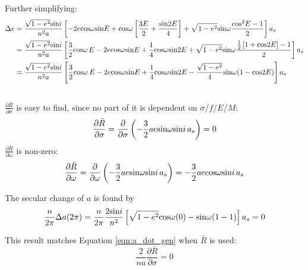 \documentclass[]{aiaa-tc}%
\begin{document}
Further simplifying:
	\begin{equation}
\begin{aligned} 
\Delta e &=\frac{\sqrt{1-e^2}\textup{sin}i}{n^2a} \left [ -2e\textup{cos}\omega \textup{sin}E +\textup{cos}\omega\left [\frac{3E}{2}+\frac{\textup{sin} 2E}{4}  \right ] + \sqrt{1-e^2}\textup{sin}\omega\frac{\textup{cos}^2E-1}{2}\right ]a_s \\
 &=\frac{\sqrt{1-e^2}\textup{sin}i}{n^2a} \left [ \frac{3}{2}\textup{cos}\omega \,E-2e\textup{cos}\omega \textup{sin}E +\frac{1}{4} \textup{cos}\omega \textup{sin} 2E  + \sqrt{1-e^2}\textup{sin}\omega\frac{\frac{1}{2} \left [1+\textup{cos}2E  \right ]-1}{2}\right ]a_s \\ 
 &=\frac{\sqrt{1-e^2}\textup{sin}i}{n^2a} \left [ \frac{3}{2}\textup{cos}\omega \,E-2e\textup{cos}\omega \textup{sin}E +\frac{1}{4} \textup{cos}\omega \textup{sin} 2E  - \frac{\sqrt{1-e^2}}{4}\textup{sin}\omega(1-\textup{cos}2E )\right ]a_s \\ 
\label{eqn:delta_e}
\end{aligned}
	\end{equation}

\subsection{}

$\frac{\partial \bar{R}}{\partial \sigma}$ is easy to find, since no part of it is dependent on $\sigma$/$f$/$E$/$M$:
	\begin{equation} 
\frac{\partial \bar{R}}{\partial \sigma} = \frac{\partial }{\partial \sigma}\left ( -\frac{3}{2}ae\textup{sin} \omega \textup{sin}i\,   a_s  \right ) = 0
	\end{equation}
$\frac{\partial \bar{R}}{\partial \omega}$ is non-zero:
	\begin{equation} 
\frac{\partial \bar{R}}{\partial \omega} = \frac{\partial }{\partial \omega}\left ( -\frac{3}{2}ae\textup{sin} \omega \textup{sin}i\,   a_s  \right ) = -\frac{3}{2}ae\textup{cos} \omega \textup{sin}i\,   a_s
	\end{equation}

The secular change of $a$ is found by
	\begin{equation} 
\frac{n}{2\pi}\Delta a(2\pi)=\frac{n}{2\pi}\frac{2\textup{sin}i}{n^2}\left [ \sqrt{1-e^2}\textup{cos}\omega(0) -\textup{sin}\omega(1-1)\right ]a_s = 0
	\end{equation}

This result matches Equation \ref{eqn:a_dot_gen} when $\bar{R}$ is used:
	\begin{equation} 
\frac{2}{na}\frac{\partial \bar{R}}{\partial \sigma} = 0
	\end{equation}
\end{document}
